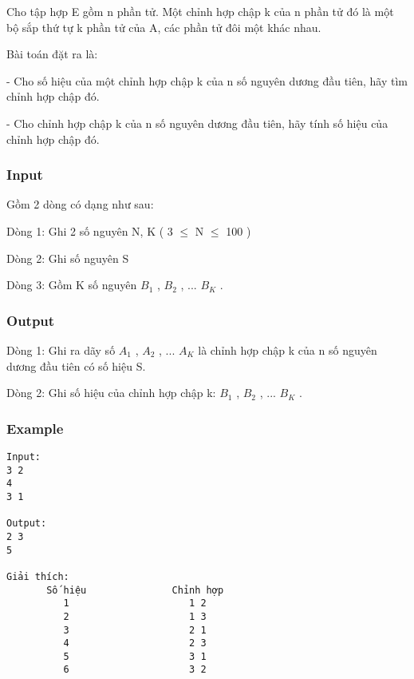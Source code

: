 



   Cho tập hợp E gồm n phần tử. Một chỉnh hợp chập k  của n phần tử đó là một bộ sắp thứ tự k phần tử của A, các phần tử đôi một khác nhau.  

   Bài toán đặt ra là:  

   - Cho số hiệu của một chỉnh hợp chập k của n số nguyên dương đầu tiên, hãy tìm chỉnh hợp chập đó.  

   - Cho chỉnh hợp chập k của n số nguyên dương đầu tiên, hãy tính số hiệu của chỉnh hợp chập đó.  

\subsubsection{   Input  }

   Gồm 2 dòng có dạng như sau:  

   Dòng 1: Ghi 2 số nguyên N, K ( 3  $\le$  N  $\le$  100 )  

   Dòng 2: Ghi số nguyên S  

   Dòng 3: Gồm K số nguyên $B_{1}$   , $B_{2}$   , ... $B_{K}$   .  

\subsubsection{   Output  }

   Dòng 1: Ghi ra dãy số $A_{1}$   , $A_{2}$   , ... $A_{K}$   là chỉnh hợp chập k của n số nguyên dương đầu tiên có số hiệu S.  

   Dòng 2: Ghi số hiệu của chỉnh hợp chập k: $B_{1}$   , $B_{2}$   , ... $B_{K}$   .  

\subsubsection{   Example  }
\begin{verbatim}
Input:
3 2 
4
3 1

Output:
2 3
5

Giải thích:
       Số hiệu               Chỉnh hợp
          1                     1 2
          2                     1 3
          3                     2 1
          4                     2 3
          5                     3 1
          6                     3 2

\end{verbatim}
